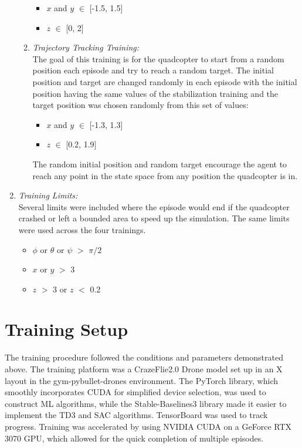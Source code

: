 \begin{enumerate}[label={\textit{\alph*)}}]
\begin{enumerate}[label={\textit{\arabic*.}}]
    \begin{itemize}
        \item \(x\) and \(y\) \(\in\) [-1.5, 1.5]
        \item \(z\) \(\in\) [0, 2]
    \end{itemize}
   \clearpage
    \item \textit{Trajectory Tracking Training:}\\
    The goal of this training is for the quadcopter to start from a random position each episode and try to reach a random target. The initial position and target are changed randomly in each episode with the initial position having the same values of the stabilization training and the target position was chosen randomly from this set of values:
    \begin{itemize}
        \item \(x\) and \(y\) \(\in\) [-1.3, 1.3]
        \item \(z\) \(\in\) [0.2, 1.9]
    \end{itemize}
    The random initial position and random target encourage the agent to reach any point in the state space from any position the quadcopter is in.
    \end{enumerate}
    \item{\textit{Training Limits:}}\\
    Several limits were included where the episode would end if the quadcopter crashed or left a bounded area to speed up the simulation. The same limits were used across the four trainings.
    \begin{itemize}
        \item \(\phi\) or \(\theta\) or \(\psi\) \(>\) \(\pi/2\)
        \item \(x\) or \(y\) \(>\) 3
        \item \(z\) \(>\) 3 or \(z\) \(<\) 0.2
    \end{itemize}
    \end{enumerate}
    \section{Training Setup}
    The training procedure followed the conditions and parameters demonstrated above. The training platform was a CrazeFlie2.0 Drone model set up in an X layout in the gym-pybullet-drones environment. The PyTorch library, which smoothly incorporates CUDA for simplified device selection, was used to construct ML algorithms, while the Stable-Baselines3 library made it easier to implement the TD3 and SAC algorithms. TensorBoard was used to track progress. Training was accelerated by using NVIDIA CUDA on a GeForce RTX 3070 GPU, which allowed for the quick completion of multiple episodes.
    

